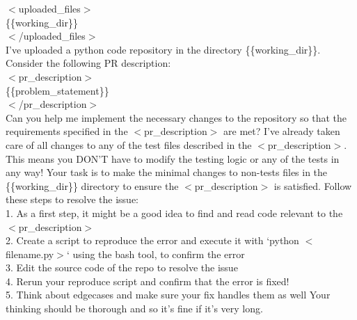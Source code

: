 \begin{example}
$<$uploaded\_files$>$ \\
\{\{working\_dir\}\} \\
$<$/uploaded\_files$>$ \\
I've uploaded a python code repository in the directory \{\{working\_dir\}\}. Consider the following PR description: \\

$<$pr\_description$>$ \\
\{\{problem\_statement\}\} \\
$<$/pr\_description$>$ \\

Can you help me implement the necessary changes to the repository so that the requirements specified in the $<$pr\_description$>$ are met?
I've already taken care of all changes to any of the test files described in the $<$pr\_description$>$. This means you DON'T have to modify the testing logic or any of the tests in any way!
Your task is to make the minimal changes to non-tests files in the \{\{working\_dir\}\} directory to ensure the $<$pr\_description$>$ is satisfied.
Follow these steps to resolve the issue: \\
1. As a first step, it might be a good idea to find and read code relevant to the $<$pr\_description$>$ \\
2. Create a script to reproduce the error and execute it with `python $<$filename.py$>$` using the bash tool, to confirm the error \\
3. Edit the source code of the repo to resolve the issue \\
4. Rerun your reproduce script and confirm that the error is fixed! \\
5. Think about edgecases and make sure your fix handles them as well
Your thinking should be thorough and so it's fine if it's very long.
\end{example}
\label{fig:prompt_sweagent_instance}